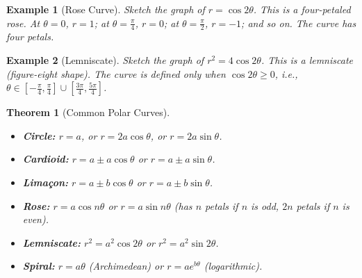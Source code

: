 \documentclass[11pt,a4paper]{article}
\newtheorem{example}{Example}
\newtheorem{theorem}{Theorem}
\begin{document}
\begin{example}[Rose Curve]
Sketch the graph of $r = \cos 2\theta$.
This is a four-petaled rose. At $\theta = 0$, $r = 1$; at $\theta = \frac{\pi}{4}$, $r = 0$; at $\theta = \frac{\pi}{2}$, $r = -1$; and so on. The curve has four petals.
\begin{center}
\end{center}
\end{example}
\begin{example}[Lemniscate]
Sketch the graph of $r^2 = 4 \cos 2\theta$.
This is a lemniscate (figure-eight shape). The curve is defined only when $\cos 2\theta \geq 0$, i.e., $\theta \in [-\frac{\pi}{4}, \frac{\pi}{4}] \cup [\frac{3\pi}{4}, \frac{5\pi}{4}]$.
\begin{center}
\end{center}
\end{example}
\begin{theorem}[Common Polar Curves]
\begin{itemize}
\item \textbf{Circle:} $r = a$, or $r = 2a \cos \theta$, or $r = 2a \sin \theta$.
\item \textbf{Cardioid:} $r = a \pm a \cos \theta$ or $r = a \pm a \sin \theta$.
\item \textbf{Limaçon:} $r = a \pm b \cos \theta$ or $r = a \pm b \sin \theta$.
\item \textbf{Rose:} $r = a \cos n\theta$ or $r = a \sin n\theta$ (has $n$ petals if $n$ is odd, $2n$ petals if $n$ is even).
\item \textbf{Lemniscate:} $r^2 = a^2 \cos 2\theta$ or $r^2 = a^2 \sin 2\theta$.
\item \textbf{Spiral:} $r = a\theta$ (Archimedean) or $r = a e^{b\theta}$ (logarithmic).
\end{itemize}
\end{theorem}
\end{document}

